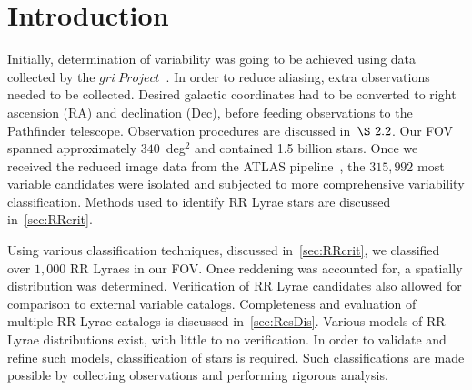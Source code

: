 \documentclass[aps,prb,twocolumn,superscriptaddress]{revtex4-1}
\begin{document}
\maketitle    




\section{Introduction}

Initially, determination of variability was going to be achieved using data collected by the $gri~Project$~\cite{gri}.  %
In order to reduce aliasing, extra observations needed to be collected.  Desired galactic coordinates had to 
be converted to right ascension (RA) and declination (Dec), before feeding observations to the Pathfinder telescope.
Observation procedures are discussed in~$\S~2.2$.  %
Our FOV spanned approximately $340$~deg$^{2}$ and contained 1.5 billion stars.  Once we received the reduced 
image data from the ATLAS pipeline~\cite{gri}, the $315,992$ most variable candidates were isolated and subjected to 
more comprehensive variability classification.  Methods used to identify RR Lyrae stars are discussed in~\cref{sec:RRcrit}.

\indent Using various classification techniques, discussed in~\cref{sec:RRcrit}, we classified over $1,000$ RR Lyraes in our FOV.  Once reddening was accounted for, a spatially distribution was determined.  
Verification of RR Lyrae candidates also allowed for comparison to external 
variable catalogs.  Completeness and evaluation of multiple RR Lyrae catalogs 
is discussed in~\cref{sec:ResDis}.  Various models of RR Lyrae distributions 
exist, with little to no verification.  In order to validate and refine such 
models, classification of stars is required.   Such classifications are made 
possible by collecting observations and performing rigorous analysis.
  
\end{document}
